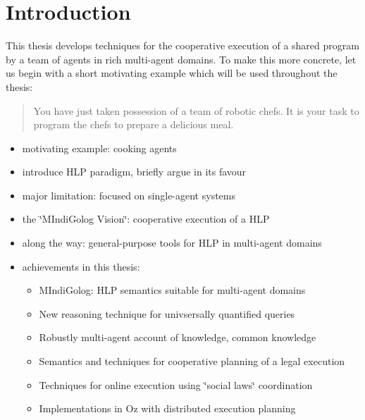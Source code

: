  


\chapter{Introduction}

This thesis develops techniques for the cooperative execution of a
shared program by a team of agents in rich multi-agent domains. To
make this more concrete, let us begin with a short motivating example
which will be used throughout the thesis:

\begin{quote}
You have just taken possession of a team of robotic chefs. It is your
task to program the chefs to prepare a delicious meal. 
\end{quote}
\begin{itemize}
\item motivating example: cooking agents 
\item introduce HLP paradigm, briefly argue in its favour 
\item major limitation: focused on single-agent systems 
\item the \char`\"{}MIndiGolog Vision\char`\"{}: cooperative execution of
a HLP 
\item along the way: general-purpose tools for HLP in multi-agent domains 
\item achievements in this thesis:

\begin{itemize}
\item MIndiGolog: HLP semantics suitable for multi-agent domains 
\item New reasoning technique for univsersally quantified queries 
\item Robustly multi-agent account of knowledge, common knowledge 
\item Semantics and techniques for cooperative planning of a legal execution 
\item Techniques for online execution using \char`\"{}social laws\char`\"{}
coordination 
\item Implementations in Oz with distributed execution planning 
\end{itemize}
\end{itemize}
